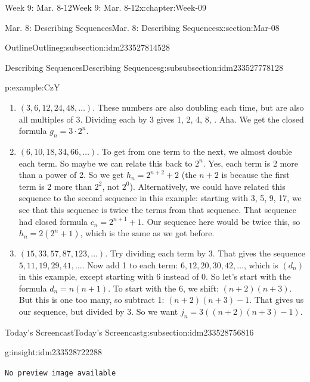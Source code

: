 \documentclass[oneside,10pt,]{book}
\newcommand{\mono}[1]{\texttt{#1}}
\numberwithin{equation}{section}
\newlength{\qrsize}
\newlength{\previewwidth}
\begin{document}
\begin{chapterptx}{Week 9: Mar. 8-12}{}{Week 9: Mar. 8-12}{}{}{x:chapter:Week-09}
\begin{sectionptx}{Mar. 8: Describing Sequences}{}{Mar. 8: Describing Sequences}{}{}{x:section:Mar-08}
\begin{subsectionptx}{Outline}{}{Outline}{}{}{g:subsection:idm233527814528}
\begin{subsubsectionptx}{Describing Sequences}{}{Describing Sequences}{}{}{g:subsubsection:idm233527778128}
\begin{example}{}{p:example:CzY}
\begin{enumerate}
\item{}\((3, 6, 12, 24, 48, \ldots )\). These numbers are also doubling each time, but are also all multiples of 3. Dividing each by 3 gives 1, 2, 4, 8, \textellipsis{}. Aha. We get the closed formula \(g_n = 3\cdot 2^{n}\).%
\item{}\((6, 10, 18, 34, 66, \ldots )\). To get from one term to the next, we almost double each term. So maybe we can relate this back to \(2^n\). Yes, each term is 2 more than a power of 2. So we get \(h_n = 2^{n+2} + 2\) (the \(n+2\) is because the first term is 2 more than \(2^2\), not \(2^0\)). Alternatively, we could have related this sequence to the second sequence in this example: starting with 3, 5, 9, 17, \textellipsis{} we see that this sequence is twice the terms from that sequence. That sequence had closed formula \(c_n = 2^{n+1} + 1\). Our sequence here would be twice this, so \(h_n = 2(2^n + 1)\), which is the same as we got before.%
\item{}\((15, 33, 57, 87, 123, \ldots)\). Try dividing each term by 3. That gives the sequence \(5, 11, 19, 29, 41,\ldots\). Now add 1 to each term: \(6, 12, 20, 30, 42, \ldots\), which is \((d_n)\) in this example, except starting with 6 instead of 0. So let's start with the formula \(d_n= n(n+1)\). To start with the 6, we shift: \((n+2)(n+3)\). But this is one too many, so subtract 1: \((n+2)(n+3) - 1\). That gives us our sequence, but divided by 3. So we want \(j_n = 3((n+2)(n+3) - 1)\).%
\end{enumerate}
%
\end{example}
\end{subsubsectionptx}
\end{subsectionptx}
%
%
\typeout{************************************************}
\typeout{************************************************}
%
\begin{subsectionptx}{Today's Screencast}{}{Today's Screencast}{}{}{g:subsection:idm233528756816}
\begin{insight}{}{g:insight:idm233528722288}%
\setlength{\qrsize}{9em}
\setlength{\previewwidth}{\linewidth}
\addtolength{\previewwidth}{-\qrsize}
\begin{tcbraster}[raster columns=2, raster column skip=1pt, raster halign=center, raster force size=false, raster left skip=0pt, raster right skip=0pt]%
\begin{tcolorbox}[previewstyle, width=\previewwidth]%
\mono{No preview image available}%
\end{tcolorbox}%

\end{tcbraster}
\end{insight}
\end{subsectionptx}
\end{sectionptx}
\end{chapterptx}
\end{document}
